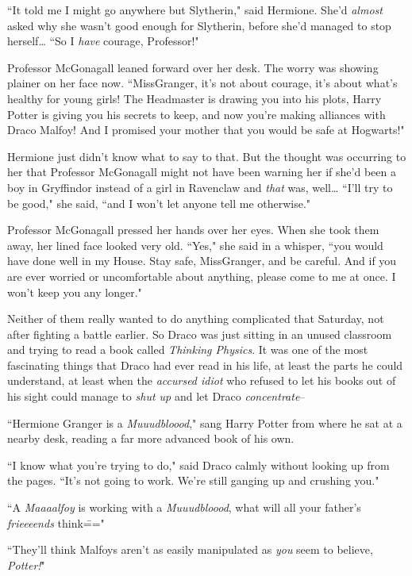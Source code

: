 ``It told me I might go anywhere but Slytherin," said Hermione. She'd \emph{almost} asked why she wasn't good enough for Slytherin, before she'd managed to stop herself{\ldots} ``So I \emph{have} courage, Professor!"

Professor McGonagall leaned forward over her desk. The worry was showing plainer on her face now. ``Miss\?Granger, it's not about courage, it's about what's healthy for young girls! The Headmaster is drawing you into his plots, Harry Potter is giving you his secrets to keep, and now you're making alliances with Draco Malfoy! And I promised your mother that you would be safe at Hogwarts!"

Hermione just didn't know what to say to that. But the thought was occurring to her that Professor McGonagall might not have been warning her if she'd been a boy in Gryffindor instead of a girl in Ravenclaw and \emph{that} was, well{\ldots} ``I'll try to be good," she said, ``and I won't let anyone tell me otherwise."

Professor McGonagall pressed her hands over her eyes. When she took them away, her lined face looked very old. ``Yes," she said in a whisper, ``you would have done well in my House. Stay safe, Miss\?Granger, and be careful. And if you are ever worried or uncomfortable about anything, please come to me at once. I won't keep you any longer."


Neither of them really wanted to do anything complicated that Saturday, not after fighting a battle earlier. So Draco was just sitting in an unused classroom and trying to read a book called \emph{Thinking Physics}. It was one of the most fascinating things that Draco had ever read in his life, at least the parts he could understand, at least when the \emph{accursed idiot} who refused to let his books out of his sight could manage to \emph{shut up} and let Draco \emph{concentrate}\---

``Hermione Granger is a \emph{Muuudbloood}," sang Harry Potter from where he sat at a nearby desk, reading a far more advanced book of his own.

``I know what you're trying to do," said Draco calmly without looking up from the pages. ``It's not going to work. We're still ganging up and crushing you."

``A \emph{Maaaalfoy} is working with a \emph{Muuudbloood}, what will all your father's \emph{frieeeends} think\==="

``They'll think Malfoys aren't as easily manipulated as \emph{you} seem to believe, \emph{Potter!}"

